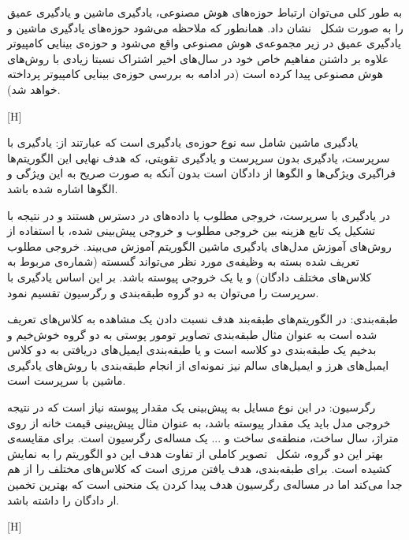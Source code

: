 به طور کلی می‌توان ارتباط حوزه‌های هوش مصنوعی، یادگیری ماشین و یادگیری عمیق را به صورت شکل~ نشان داد. همانطور که ملاحظه می‌شود حوزه‌های یادگیری ماشین و یادگیری عمیق در زیر مجموعه‌ی هوش مصنوعی واقع می‌شود و حوزه‌ی بینایی کامپیوتر علاوه بر داشتن مفاهیم خاص خود در سال‌های اخیر اشتراک نسبتا زیادی با روش‌های هوش مصنوعی پیدا کرده است (در ادامه به بررسی حوزه‌ی بینایی کامپیوتر پرداخته خواهد شد).

[H]


یادگیری ماشین شامل سه نوع حوزه‌ی یادگیری است که عبارتند از: یادگیری با سرپرست، یادگیری بدون سرپرست و یادگیری تقویتی، که هدف نهایی این الگوریتم‌ها فراگیری ویژگی‌ها و الگوها از دادگان است بدون آنکه به صورت صریح به این ویژگی‌ و الگوها اشاره شده باشد.

در یادگیری با سرپرست، خروجی مطلوب یا داده‌های  در دسترس هستند و در نتیجه با تشکیل یک تابع هزینه بین خروجی مطلوب و خروجی پیش‌بینی شده، با استفاده از روش‌های آموزش مدل‌های یادگیری ماشین الگوریتم آموزش می‌بیند. خروجی مطلوب تعریف شده بسته به وظیفه‌ی مورد نظر می‌تواند گسسته (شماره‌ی مربوط به کلاس‌های مختلف دادگان) و یا یک خروجی پیوسته باشد. بر این اساس یادگیری با سرپرست را می‌توان به دو گروه طبقه‌بندی و رگرسیون تقسیم نمود.

 طبقه‌بندی: در الگوریتم‌های طبقه‌بند هدف نسبت دادن یک مشاهده‌ به کلاس‌های تعریف شده است به عنوان مثال طبقه‌بندی تصاویر تومور پوستی به دو گروه خوش‌خیم و بدخیم یک طبقه‌بندی دو کلاسه است و یا طبقه‌بندی ایمیل‌های دریافتی به دو کلاس‌ ایمبل‌های هرز و ایمیل‌های سالم نیز نمونه‌ای از انجام طبقه‌بندی با روش‌های یادگیری ماشین با سرپرست است.

 رگرسیون: در این نوع مسایل به پیش‌بینی یک مقدار پیوسته نیاز است که در نتیجه خروجی مدل باید یک مقدار پیوسته باشد، به عنوان مثال پیش‌بینی قیمت خانه از روی متراژ، سال ساخت، منطقه‌ی ساخت و ... یک مساله‌ی رگرسیون است.
برای مقایسه‌ی بهتر این دو گروه، شکل~ تصویر کاملی از تفاوت هدف این دو الگوریتم را به نمایش کشیده است. برای طبقه‌بندی، هدف یافتن مرزی است که کلاس‌های مختلف را از هم جدا می‌کند اما در مساله‌ی رگرسیون هدف پیدا کردن یک منحنی است که بهترین تخمین ار دادگان را داشته باشد.

[H]

